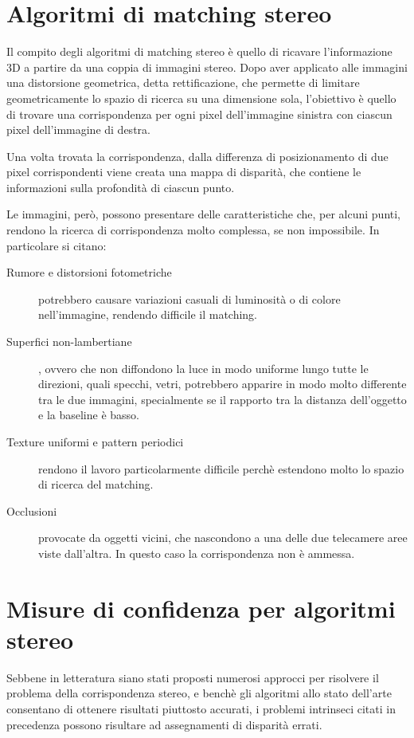 \documentclass[12pt,a4paper]{report}
\begin{document}
\section{Algoritmi di matching stereo}

Il compito degli algoritmi di matching stereo è quello di ricavare
l'informazione 3D a partire da una coppia di immagini stereo.  Dopo aver
applicato alle immagini una distorsione geometrica, detta rettificazione, che
permette di limitare geometricamente lo spazio di ricerca su una dimensione
sola, l'obiettivo è quello di trovare una corrispondenza per ogni pixel
dell'immagine sinistra con ciascun pixel dell'immagine di destra.

Una volta trovata la corrispondenza, dalla differenza di posizionamento di due
pixel corrispondenti viene creata una mappa di disparità, che contiene le
informazioni sulla profondità di ciascun punto. 

Le immagini, però, possono presentare delle caratteristiche che, per alcuni
punti, rendono la ricerca di corrispondenza molto complessa, se non
impossibile. In particolare si citano:

\begin{description}
    \item [Rumore e distorsioni fotometriche] potrebbero causare variazioni
        casuali di luminosità o di colore nell'immagine, rendendo difficile il
        matching.
    \item [Superfici non-lambertiane], ovvero che non diffondono la luce in modo
        uniforme lungo tutte le direzioni, quali specchi, vetri, potrebbero
        apparire in modo molto differente tra le due immagini, specialmente se
        il rapporto tra la distanza dell'oggetto e la baseline è basso.
    \item [Texture uniformi e pattern periodici] rendono il lavoro
        particolarmente difficile perchè estendono molto lo spazio di ricerca
        del matching.
    \item [Occlusioni] provocate da oggetti vicini, che nascondono a una delle
        due telecamere aree viste dall'altra. In questo caso la corrispondenza
        non è ammessa.
\end{description}

\section{Misure di confidenza per algoritmi stereo}

Sebbene in letteratura siano stati proposti numerosi approcci per risolvere il
problema della corrispondenza stereo, e benchè gli algoritmi allo stato
dell'arte consentano di ottenere risultati piuttosto accurati, i problemi
intrinseci citati in precedenza possono risultare ad assegnamenti di disparità
errati.
\end{document}
